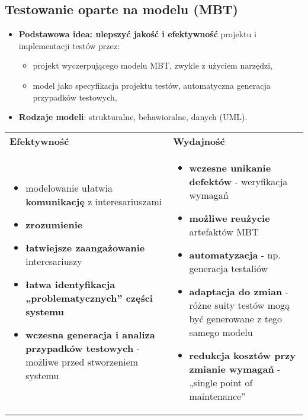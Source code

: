 \documentclass[../main.tex]{subfiles}
\begin{document}
    \subsection{Testowanie oparte na modelu (MBT)}

    \begin{itemize}
        \item \textbf{Podstawowa idea: ulepszyć jakość i efektywność} projektu i implementacji testów przez:
        \begin{itemize}
            \item projekt wyczerpującego modelu MBT, zwykle z użyciem narzędzi,
            \item model jako specyfikacja projektu testów, automatyczna generacja przypadków testowych,
        \end{itemize}
        \item \textbf{Rodzaje modeli}: strukturalne, behawioralne, danych (UML).
    \end{itemize}

    \begin{table}[H]
        \begin{center}
            \begin{tabular}{p{8cm} p{8cm}}
                \textbf{Efektywność} & \textbf{Wydajność}\\
                \begin{itemize}
                    \item modelowanie ułatwia \textbf{komunikację} z interesariuszami
                    \item \textbf{zrozumienie}
                    \item \textbf{łatwiejsze zaangażowanie} interesariuszy
                    \item \textbf{łatwa identyfikacja „problematycznych” części systemu}
                    \item \textbf{wczesna generacja i analiza przypadków testowych} - możliwe przed stworzeniem systemu
                \end{itemize}
                &
                \begin{itemize}
                    \item \textbf{wczesne unikanie defektów} - weryfikacja wymagań
                    \item \textbf{możliwe reużycie} artefaktów MBT
                    \item \textbf{automatyzacja} - np. generacja testaliów
                    \item \textbf{adaptacja do zmian} - różne suity testów mogą być generowane z tego samego modelu
                    \item \textbf{redukcja kosztów przy zmianie wymagań} - „single point of maintenance”
                \end{itemize}\\
            \end{tabular}
        \end{center}
    \end{table}
\end{document}
